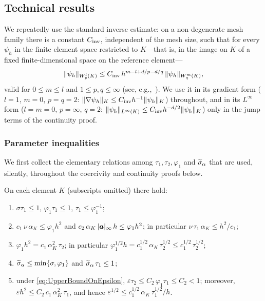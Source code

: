 \subsection{Technical results}\label{sec:auxiliary}

We repeatedly use the standard inverse estimate: on a non{\hyp}degenerate mesh family there is a
constant $C_{\mathrm{inv}}$, independent of the mesh size, such that for every $\psi_h$ in the finite
element space restricted to $K$---that is, in the image on $K$ of a fixed finite{\hyp}dimensional
space on the reference element---
\begin{equation}
    \|\psi_h \|_{W^l_p(K)} \le C_{\mathrm{inv}}\, h^{m-l + d/p - d/q}\, \| \psi_h \|_{W^m_q(K)},
    \label{eq:InverseEstimateFiniteOrderNorm}
\end{equation}
valid for $0 \le m \le l$ and $1\le p,q \le \infty$ (see,
e.g.,~\cite[Thm.~4.5.11]{brenner2008mathematical}). We use it in its gradient form
($l=1$, $m=0$, $p=q=2$: $\lVert\nabla\psi_h\rVert_K\le C_{\mathrm{inv}} h^{-1}\lVert\psi_h\rVert_K$) throughout,
and in its $L^\infty$ form ($l=m=0$, $p=\infty$, $q=2$:
$\lVert\psi_h\rVert_{L^\infty(K)}\le C_{\mathrm{inv}} h^{-d/2}\lVert\psi_h\rVert_K$) only in the jump terms of the
continuity proof.

\subsubsection{Parameter inequalities}

We first collect the elementary relations among $\tau_1,\tau_2,\varphi_1$ and $\widetilde{\sigma}_{\alpha}$ that
are used, silently, throughout the coercivity and continuity proofs below.

\begin{lemma}\label{lem:parameters}
On each element $K$ (subscripts omitted) there hold:
\begin{enumerate}[label=\textup{(P\arabic*)},leftmargin=3.2em]
  \item\label{P:basic}
  $\sigma\tau_1\le 1$, $\varphi_1\tau_1\le 1$, $\tau_1\le \varphi_1^{-1}$;
  \item\label{P:components}
  $c_1\,\nu\,\alpha_K\le \varphi_1 h^2$ and
  $c_2\,\alpha_K\,|\boldsymbol{a}|_{\infty}\,h\le \varphi_1 h^2$; in particular
  $\nu\,\tau_1\,\alpha_K\le h^2/c_1$;
  \item\label{P:27}
  $\varphi_1 h^2 = c_1\,\alpha_K^2\,\tau_2$; in particular
  $\varphi_1^{1/2} h = c_1^{1/2}\,\alpha_K\,\tau_2^{1/2}
  \le c_1^{1/2}\,\tau_2^{1/2}$;
  \item\label{P:sigmatilde}
  $\widetilde{\sigma}_{\alpha}\le\min\{\sigma,\varphi_1\}$ and
  $\widetilde{\sigma}_{\alpha}\,\tau_1\le 1$;
  \item\label{P:eps}
  under \eqref{eq:UpperBoundOnEpsilon}, $\varepsilon\tau_2\le C_2\,\varphi_1\tau_1\le C_2<1$;
  moreover, $\varepsilon h^2\le C_2\,c_1\,\alpha_K^2\,\tau_1$, and hence
  $\varepsilon^{1/2}\le c_1^{1/2}\,\alpha_K\,\tau_1^{1/2}/h$.
\end{enumerate}
\end{lemma}

